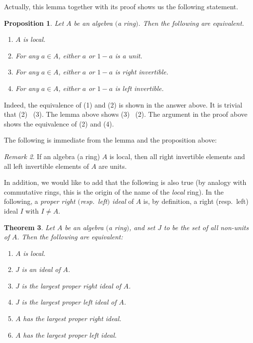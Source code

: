 \documentclass{surv-l}
\numberwithin{equation}{chapter}
\numberwithin{figure}{chapter}
\theoremstyle{plain}
\newtheorem{thm}{Theorem}[section]
\newtheorem{prp}[thm]{Proposition}
\theoremstyle{definition}
\theoremstyle{remark}
\newtheorem{rmk}[thm]{Remark}
\begin{document}
Actually, this lemma together with its proof shows us the following statement.

\begin{prp}
Let $A$ be an algebra $($a ring$)$.
Then the following are equivalent.
\begin{enumerate}
\item
$A$ is local.
\item
For any $a \in A$, either $a$ or $1-a$ is a unit.
\item
For any $a \in A$, either $a$ or $1-a$ is right invertible.
\item
For any $a \in A$, either $a$ or $1-a$ is left invertible.
\end{enumerate}
\end{prp}
Indeed, the equivalence of (1) and (2) is shown in the answer above.
It is trivial that (2) \text{$\Rightarrow$}\  (3).
The lemma above shows (3) \text{$\Rightarrow$}\  (2).
The argument in the proof above shows the equivalence of (2) and (4).

The following is immediate from the lemma and the proposition above:

\begin{rmk}\label{rmk:unit}
If an algebra (a ring) $A$ is local, then all right invertible elements and all left invertible elements
of $A$ are units.
\end{rmk}

In addition, we would like to add that the following is also true
(by analogy with commutative rings, this is the origin of the name of the {\em local} ring).
In the following, a {\em proper right $($resp.\ left$)$ ideal} of $A$ is, by definition,
a right (resp.\ left) ideal $I$ with $I \ne A$.

\begin{thm}\label{thm:local}
Let $A$ be an algebra $($a ring$)$, and set $J$ to be the set of all non-units of $A$.
Then the following are equivalent:

\begin{enumerate}[resume]
\item
$A$ is local.
\item
$J$ is an ideal of $A$.
\item
$J$ is the largest proper right ideal of $A$.
\item
$J$ is the largest proper left ideal of $A$.
\item
$A$ has the largest proper right ideal.
\item
$A$ has the largest proper left ideal.
\end{enumerate}
\end{thm}
\end{document}
